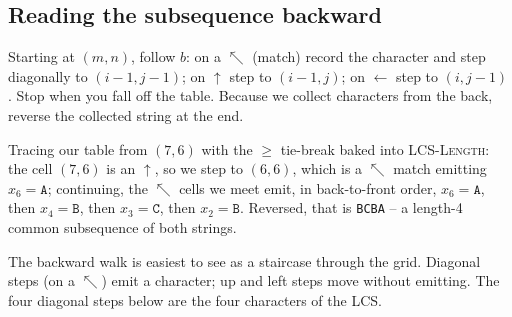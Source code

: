 \subsection{Reading the subsequence backward}

Starting at $(m,n)$, follow $b$: on a $\nwarrow$ (match) record the character
and step diagonally to $(i-1,j-1)$; on $\uparrow$ step to $(i-1,j)$; on
$\leftarrow$ step to $(i,j-1)$. Stop when you fall off the table. Because we
collect characters from the back, reverse the collected string at the end.

\begin{algorithm}[H]
\caption{\textsc{Print-LCS}$(b, X, i, j)$}
\end{algorithm}

Tracing our table from $(7,6)$ with the $\ge$ tie-break baked into
\textsc{LCS-Length}: the cell $(7,6)$ is an $\uparrow$, so we step to $(6,6)$,
which is a $\nwarrow$ match emitting $x_6=\texttt{A}$; continuing, the
$\nwarrow$ cells we meet emit, in back-to-front order, $x_6=\texttt{A}$, then
$x_4=\texttt{B}$, then $x_3=\texttt{C}$, then $x_2=\texttt{B}$. Reversed, that is
\texttt{BCBA} -- a length-4 common subsequence of both strings.

The backward walk is easiest to see as a staircase through the grid. Diagonal
steps (on a $\nwarrow$) emit a character; up and left steps move without
emitting. The four diagonal steps below are the four characters of the LCS.

